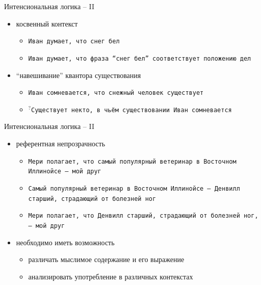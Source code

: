 \documentclass{beamer}
\begin{document}
\begin{frame}{Интенсиональная логика -- II}
\begin{itemize}
    \item косвенный контекст
    	\medskip
	    \begin{itemize}
	        \item \texttt{Иван думает, что снег бел}
	        \smallskip
	        \item \texttt{Иван думает, что фраза ``снег бел'' соответствует положению дел}
	    \end{itemize}    
	\medskip
    \item ``навешивание'' квантора существования
    	\medskip
	    \begin{itemize}
	        \item \texttt{Иван сомневается, что снежный человек существует}
	        \smallskip
	        \item $^?$\texttt{Существует некто, в чьём существовании Иван сомневается}
	    \end{itemize}   	
\end{itemize}
\end{frame}

\begin{frame}{Интенсиональная логика -- II}
\begin{itemize}
    \item референтная непрозрачность
    	\medskip
	    \begin{itemize}
	        \item \texttt{Мери полагает, что самый популярный ветеринар в Восточном Иллинойсе — мой друг}
	        \smallskip
	        \item \texttt{Самый популярный ветеринар в Восточном Иллинойсе -- Денвилл старший, страдающий от болезней ног}
	        \smallskip
	        \item \texttt{Мери полагает, что Денвилл старший, страдающий от болезней ног,— мой друг}
	    \end{itemize}   	
    \medskip
	\item необходимо иметь возможность
    	\medskip
	    \begin{itemize}
	        \item различать мыслимое содержание и его выражение
	        \item анализировать употребление в различных контекстах
	    \end{itemize}   	
\end{itemize}
\end{frame}
\end{document}
